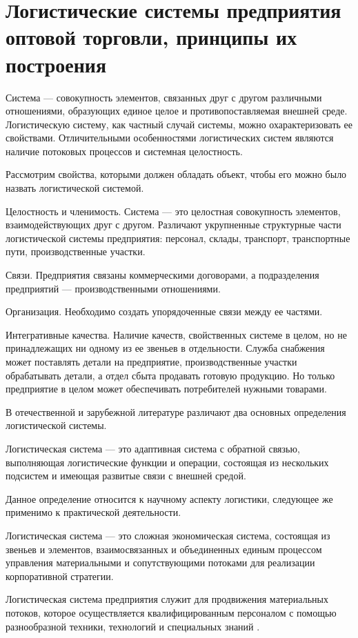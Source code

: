 \section{Логистические системы предприятия оптовой торговли, принципы их построения}

Система --- совокупность элементов, связанных друг с другом различными отношениями, образующих единое целое и противопоставляемая внешней среде.
Логистическую систему, как частный случай системы, можно охарактеризовать ее свойствами.
Отличительными особенностями логистических систем являются наличие потоковых процессов и системная целостность.

Рассмотрим свойства, которыми должен обладать объект, чтобы его можно было назвать логистической системой.

Целостность и членимость. Система --- это целостная совокупность элементов, взаимодействующих друг с другом.
Различают укрупненные структурные части логистической системы предприятия: персонал, склады, транспорт, транспортные пути, производственные участки.

Связи. Предприятия связаны коммерческими договорами, а подразделения предприятий --- производственными отношениями.

Организация. Необходимо создать упорядоченные связи между ее частями.

Интегративные качества. Наличие качеств, свойственных системе в целом, но не принадлежащих ни одному из ее звеньев в отдельности.
Служба снабжения может поставлять детали на предприятие, производственные участки обрабатывать детали, а отдел сбыта продавать готовую продукцию.
Но только предприятие в целом может обеспечивать потребителей нужными товарами.

В отечественной и зарубежной литературе различают два основных определения логистической системы.

Логистическая система --- это адаптивная система с обратной связью, выполняющая логистические функции и операции, состоящая из нескольких подсистем и имеющая развитые связи с внешней средой.

Данное определение относится к научному аспекту логистики, следующее же применимо к практической деятельности.

Логистическая система --- это сложная экономическая система, состоящая из звеньев и элементов, взаимосвязанных и объединенных единым процессом управления материальными и сопутствующими потоками для реализации корпоративной стратегии.

Логистическая система предприятия служит для продвижения материальных потоков, которое осуществляется квалифицированным персоналом с помощью разнообразной техники, технологий и специальных знаний \cite[с.114--116]{levkin}.

